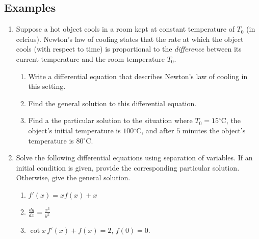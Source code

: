 \documentclass[11pt]{article}
\theoremstyle{definition}
\theoremstyle{named}
\numberwithin{myalgctr}{section}
\begin{document}
\subsection*{Examples}
\begin{enumerate}
  \item Suppose a hot object cools in a room kept at constant temperature of $T_0$ (in celcius). Newton's law of cooling states that the rate at which the object cools (with respect to time) is proportional to the {\em difference} between its current temperature and the room temperature $T_0$.
  \begin{enumerate}
    \item Write a differential equation that describes Newton's law of cooling in this setting.
    \item Find the general solution to this differential equation.
    \item Find a the particular solution to the situation where $T_0=15$$^\circ$C, the object's initial temperature is $100$$^\circ$C, and after $5$ minutes the object's temperature is $80$$^\circ$C.
  \end{enumerate}
  \item Solve the following differential equations using separation of variables. If an initial condition is given, provide the corresponding particular solution. Otherwise, give the general solution.
  \begin{enumerate}
    \item $\displaystyle f'(x)=xf(x)+x$
    \item $\displaystyle\frac{dy}{dx}=\frac{x^3}{y^2}$
    \item $\cot x\, f'(x)+f(x)=2$, $f(0)=0$.
  \end{enumerate}
\end{enumerate}
\end{document}
